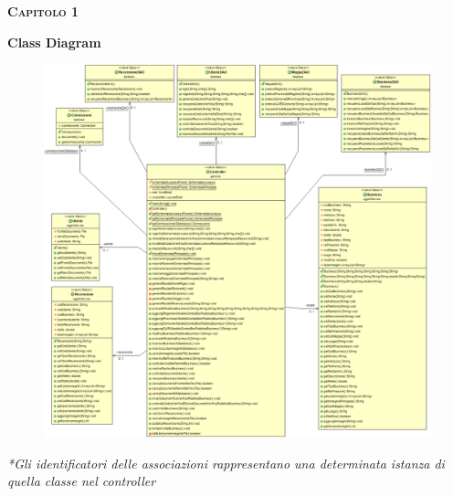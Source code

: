 \documentclass[a4paper,12pt]{article}
\begin{document}
\begin{flushleft}

\Large\textsc{\bf Capitolo 1}
\vspace*{+1cm}

\begingroup
\fontsize{35pt}{12pt}\selectfont\bf{Class Diagram}
\endgroup
\vspace*{+1cm}

\begin{center}
	\begin{figure}[h]
	\centering
 	\includegraphics[width=1\textwidth]{ClassDiagram.png}
	\end{figure}
\end{center}


\normalsize{\it{*Gli identificatori delle associazioni rappresentano una determinata istanza di quella classe nel controller}}
\end{flushleft}
\newpage
\end{document}
